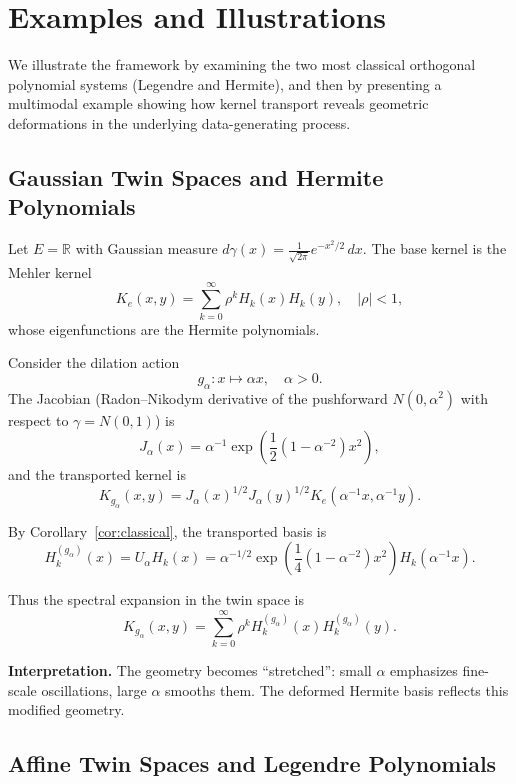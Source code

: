 \documentclass[11pt,a4paper]{article}
\newcommand{\R}{\mathbb{R}}
\begin{document}
\section{Examples and Illustrations}\label{sec:examples}

We illustrate the framework by examining the two most classical orthogonal polynomial systems (Legendre and Hermite), and then by presenting a multimodal example showing how kernel transport reveals geometric deformations in the underlying data-generating process.

\subsection{Gaussian Twin Spaces and Hermite Polynomials}

Let $E = \R$ with Gaussian measure $d\gamma(x) = \frac{1}{\sqrt{2\pi}} e^{-x^2/2} \, dx$. The base kernel is the Mehler kernel \citep{Mehler1866}
\[
K_e(x, y) = \sum_{k=0}^{\infty} \rho^k H_k(x) H_k(y), \quad |\rho| < 1,
\]
whose eigenfunctions are the Hermite polynomials.

Consider the dilation action
\[
g_\alpha : x \mapsto \alpha x, \quad \alpha > 0.
\]
The Jacobian (Radon--Nikodym derivative of the pushforward $N(0,\alpha^2)$ with respect to $\gamma=N(0,1)$) is
\[
J_\alpha(x) = \alpha^{-1}\exp\left(\frac{1}{2}(1 - \alpha^{-2}) x^2\right),
\]
and the transported kernel is
\[
K_{g_\alpha}(x, y) = J_\alpha(x)^{1/2} J_\alpha(y)^{1/2} K_e(\alpha^{-1} x, \alpha^{-1} y).
\]

By Corollary~\ref{cor:classical}, the transported basis is
\[
H_k^{(g_\alpha)}(x) = U_\alpha H_k(x) = \alpha^{-1/2}\exp\left(\frac{1}{4}(1 - \alpha^{-2}) x^2\right) H_k(\alpha^{-1} x).
\]

Thus the spectral expansion in the twin space is
\[
K_{g_\alpha}(x, y) = \sum_{k=0}^{\infty} \rho^k H_k^{(g_\alpha)}(x) H_k^{(g_\alpha)}(y).
\]

\textbf{Interpretation.} The geometry becomes ``stretched'': small $\alpha$ emphasizes fine-scale oscillations, large $\alpha$ smooths them. The deformed Hermite basis reflects this modified geometry.

\subsection{Affine Twin Spaces and Legendre Polynomials}
\end{document}
